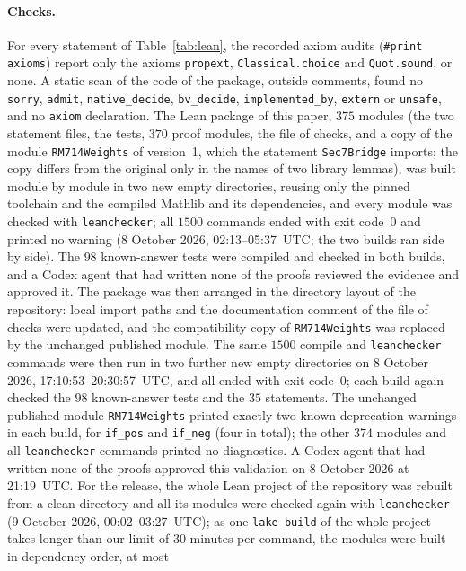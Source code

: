 \documentclass[11pt]{article}
\theoremstyle{remark}
\begin{document}
\paragraph{Checks.}
For every statement of Table~\ref{tab:lean}, the recorded axiom audits
(\texttt{\#print axioms}) report only the axioms \texttt{propext},
\texttt{Classical.choice} and \texttt{Quot.sound}, or none. A static scan of
the code of the package, outside comments, found no \texttt{sorry},
\texttt{admit}, \texttt{native\_decide}, \texttt{bv\_decide},
\texttt{implemented\_by}, \texttt{extern} or \texttt{unsafe}, and no
\texttt{axiom} declaration. The Lean package of this paper,
$375$ modules (the two statement files, the tests, $370$ proof modules, the
file of checks, and a copy of the module \texttt{RM714Weights} of version~1,
which the statement \texttt{Sec7Bridge} imports; the copy differs from the
original only in the names of two library lemmas), was built module by module
in two new empty directories, reusing only the pinned toolchain and the
compiled Mathlib and its dependencies, and every module was checked with
\texttt{leanchecker}; all $1500$ commands ended with exit code~$0$ and printed
no warning (8 October 2026, 02:13--05:37~UTC; the two builds ran side by
side). The $98$ known-answer tests were compiled and checked in both builds,
and a Codex agent that had written none of the proofs reviewed the evidence
and approved it. The package was then arranged in the directory layout of the
repository: local import paths and the documentation comment of the file of
checks were updated, and the compatibility copy of \texttt{RM714Weights} was
replaced by the unchanged published module. The same $1500$ compile and
\texttt{leanchecker} commands were then run in two further new empty
directories on 8 October 2026, 17:10:53--20:30:57~UTC, and all ended with exit
code~$0$; each build again checked the $98$ known-answer tests and the $35$
statements. The unchanged published module \texttt{RM714Weights} printed
exactly two known deprecation warnings in each build, for \texttt{if\_pos}
and \texttt{if\_neg} (four in total); the other $374$ modules and all
\texttt{leanchecker} commands printed no diagnostics. A Codex agent that had
written none of the proofs approved this validation on 8 October 2026 at
21:19~UTC.
For the release, the whole Lean project of the repository was rebuilt from a
clean directory and all its modules were checked again with
\texttt{leanchecker} (9 October 2026, 00:02--03:27~UTC); as one
\texttt{lake build} of the whole project takes longer than our limit of
30 minutes per command, the modules were built in dependency order, at most
\end{document}
